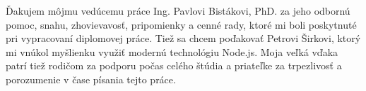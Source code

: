 Ďakujem môjmu vedúcemu práce Ing. Pavlovi Bistákovi, PhD. za jeho odbornú pomoc, snahu, zhovievavosť, pripomienky a cenné rady, ktoré mi boli poskytnuté pri vypracovaní diplomovej práce. Tiež sa chcem poďakovať Petrovi Širkovi, ktorý mi vnúkol myšlienku využiť modernú technológiu Node.js. Moja veľká vďaka patrí tiež rodičom za podporu počas celého štúdia a priateľke za trpezlivosť a porozumenie v čase písania tejto práce.